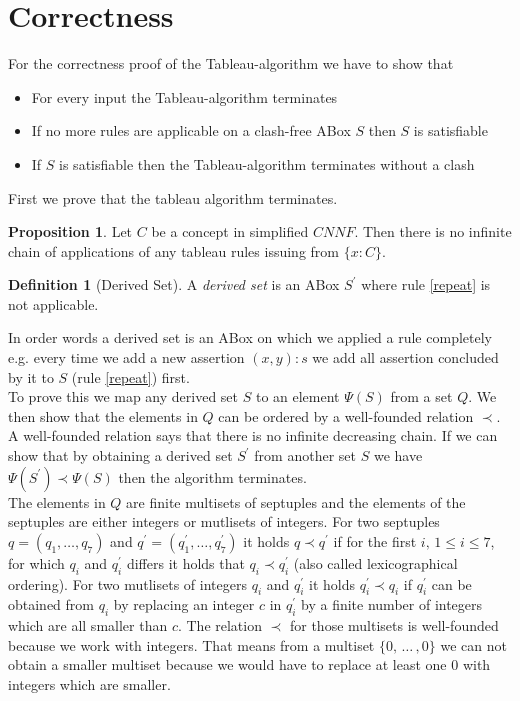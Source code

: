 \documentclass[a4paper,11pt]{scrartcl}
\theoremstyle{break}
\theoremstyle{definition}
\newtheorem{mydef}{Definition}
\newtheorem{mypro}{Proposition}
\begin{document}
\section{Correctness}
For the correctness proof of the Tableau-algorithm we have to show that
\begin{itemize}
\item For every input the Tableau-algorithm terminates
\item If no more rules are applicable on a clash-free ABox $S$ then $S$ is satisfiable
\item If $S$ is satisfiable then the Tableau-algorithm terminates without a clash
\end{itemize}
First we prove that the tableau algorithm terminates. 
\begin{mypro}
Let $C$ be a concept in simplified $CNNF$. Then there is no infinite chain of applications of any tableau rules issuing from $\{x:C\}$. 
\end{mypro}
\begin{mydef}[Derived Set]
A \textit{derived set} is an ABox $S^\prime$ where rule \ref{repeat} is not applicable.
\end{mydef}
In order words a derived set is an ABox on which we applied a rule completely e.g. every time we add a new assertion $(x,y):s$ we add all assertion concluded by it to $S$ (rule \ref{repeat}) first.\\
To prove this we map any derived set $S$ to an element $\Psi(S)$ from a set $Q$. We then show that the elements in $Q$ can be ordered by a well-founded relation $\prec$. A well-founded relation says that there is no infinite decreasing chain. If we can show that by obtaining a derived set $S^\prime$ from another set $S$ we have $\Psi(S^\prime)\prec\Psi(S)$ then the algorithm terminates.\\
The elements in $Q$ are finite multisets of septuples and the elements of the septuples are either integers or mutlisets of integers. For two septuples $q=(q_1,\dots,q_7)$ and $q^\prime=(q^\prime_1,\dots,q^\prime_7)$ it holds $q\prec q^\prime$ if for the first $i,\, 1\leq i\leq 7$, for which $q_i$ and $q_i^\prime$ differs it holds that $q_i\prec q_i^\prime$ (also called lexicographical ordering). For two mutlisets of integers $q_i$ and $q_i^\prime$ it holds $q_i^\prime\prec q_i$ if $q_i^\prime$ can be obtained from $q_i$ by replacing an integer $c$ in $q_i^\prime$ by a finite number of integers which are all smaller than $c$. The relation $\prec$ for those multisets is well-founded because we work with integers. That means from a multiset $\{0,\,\dots\,,0\}$ we can not obtain a smaller multiset because we would have to replace at least one $0$ with integers which are smaller.\\
\end{document}
